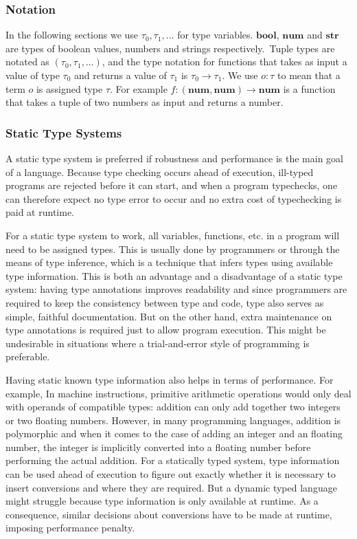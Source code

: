 \newcommand{\tnum}{\textbf{num}}
\newcommand{\tstr}{\textbf{str}}
\newcommand{\tbool}{\textbf{bool}}
\newcommand{\tarr}[2]{#1 \rightarrow #2}

\subsubsection{Notation}
In the following sections we use $\tau_0, \tau_1, \ldots$ for type variables.
$\tbool$, $\tnum$ and $\tstr$ are types of
boolean values, numbers and strings respectively.\
Tuple types are notated as $(\tau_0, \tau_1, \ldots)$,
and the type notation for functions that takes as input a value of type $\tau_0$
and returns a value of $\tau_1$ is $\tarr{\tau_0}{\tau_1}$.
We use $o : \tau$ to mean that a term $o$ is assigned type $\tau$.
For example $f : \tarr{(\tnum, \tnum)}{\tnum}$ is a function that
takes a tuple of two numbers as input and returns a number.

\subsubsection{Static Type Systems}

A static type system is preferred if robustness and performance
is the main goal of a language.
Because type checking occurs ahead of execution,
ill-typed programs are rejected before it can start, and
when a program typechecks,
one can therefore expect no type error to occur and
no extra cost of typechecking is paid at runtime.

For a static type system to work, all variables, functions, etc. in a program
will need to be assigned types. This is usually done by programmers or through the
means of type inference, which is a technique that infers types using
available type information. This is both an advantage and a disadvantage
of a static type system: having type annotations improves readability
and since programmers are required to keep the consistency between type and code,
type also serves as simple, faithful documentation.
But on the other hand, extra maintenance on type annotations
is required just to allow program execution. This might
be undesirable in situations where a trial-and-error style of programming
is preferable.

Having static known type information also helps in terms of performance.
For example, In machine instructions, primitive arithmetic operations
would only deal with operands of compatible types: addition can only add together
two integers or two floating numbers.
However, in many programming languages,
addition is polymorphic and when it comes to the case of adding an integer
and an floating number, the integer is implicitly converted into a floating number before
performing the actual addition.
For a statically typed system, type information can be used ahead of execution
to figure out exactly whether it is necessary to insert conversions
and where they are required.
But a dynamic typed language might struggle because type information
is only available at runtime.
As a consequence, similar decisions about conversions have to be made at runtime,
imposing performance penalty.

